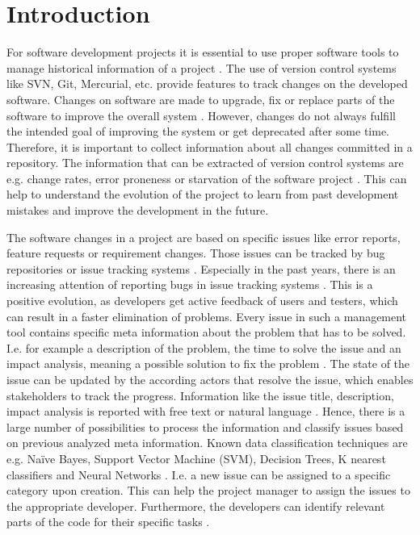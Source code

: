 \section{Introduction}
\label{sec:introduction}

For software development projects it is essential to use proper software tools to manage historical information of a project \cite{fischer2003populating}. The use of version control systems like SVN, Git, Mercurial, etc. provide features to track changes on the developed software. Changes on software are made to upgrade, fix or replace parts of the software to improve the overall system \cite{janak2009issue}. However, changes do not always fulfill the intended goal of improving the system or get deprecated after some time. Therefore, it is important to collect information about all changes committed in a repository. The information that can be extracted of version control systems are e.g. change rates, error proneness or starvation of the software project \cite{fischer2003populating}. This can help to understand the evolution of the project to learn from past development mistakes and improve the development in the future.

The software changes in a project are based on specific issues like error reports, feature requests or requirement changes. Those issues can be tracked by bug repositories or issue tracking systems \cite{fischer2003populating}. Especially in the past years, there is an increasing attention of reporting bugs in issue tracking systems \cite{ahmedpredicting}. This is a positive evolution, as developers get active feedback of users and testers, which can result in a faster elimination of problems. 
Every issue in such a management tool contains specific meta information about the problem that has to be solved. I.e. for example a description of the problem, the time to solve the issue and an impact analysis, meaning a possible solution to fix the problem \cite{fischer2003populating}. The state of the issue can be updated by the according actors that resolve the issue, which enables stakeholders to track the progress. Information like the issue title, description, impact analysis is reported with free text or natural language \cite{ahmedpredicting}. Hence, there is a large number of possibilities to process the information and classify issues based on previous analyzed meta information. Known data classification techniques are e.g. Naïve Bayes, Support Vector Machine (SVM), Decision Trees, K nearest classifiers and Neural Networks \cite{ahmedpredicting}\cite{lancaster2003indexing}. I.e. a new issue can be assigned to a specific category upon creation. This can help the project manager to assign the issues to the appropriate developer. Furthermore, the developers can identify relevant parts of the code for their specific tasks \cite{ying2004predicting}.

